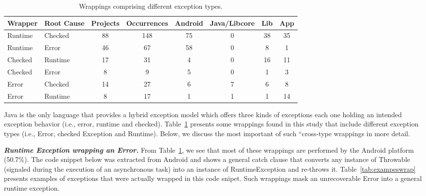 \begin{table}
\scriptsize
  \centering
  \begin{tabular}{llcccccc}
    \hline
    \bfseries{Wrapper}  &  \bfseries{Root Cause} &  \bfseries{Projects}  &  \bfseries{Occurrences} & \textsf{Android} & \textsf{Java/Libcore} & \textsf{Lib} & \textsf{App}  \\
    \hline
      
      Runtime &  Checked   & 88 & 148 &  75 &  0   & 38 &  35 \\  %
      Runtime   &  Error      & 46  &  67    &  58  &  0   & 8  &  1   \\      %
      Checked &  Runtime   & 17  & 31 & 4 &  0  & 16  &  11 \\  %
      Checked & Error         & 8    &  9  & 5  &  0  &  1 &  3  \\
      Error & Checked         & 14  &  27 &  6  &  7  &  6 &   8    \\
      Error & Runtime        & 8      &  17   & 1 &  1  & 1 &  14    \\

  \hline
  \end{tabular}
\caption{Wrappings comprising different exception types.}
\label{tab:wrappingandroid}
\end{table}

Java is the only language that provides a hybrid exception model 
which offers three kinds of exceptions each one holding an intended exception behavior (i.e., error, 
runtime and checked). Table~\ref{tab:wrappingandroid} presents some wrappings found in this study that
include different exception types (i.e., Error, checked Exception and Runtime).
Below, we discuss the most
important of such ``cross-type wrappings in more detail.

\emph{\textbf{Runtime Exception wrapping an Error.}} 
From Table~\ref{tab:wrappingandroid}, we see that most of these wrappings	
are performed by the Android platform (50.7\%).
The code snippet below was extracted from Android and shows a general catch clause 
that converts any instance of Throwable (signaled during the execution
of an asynchronous task) into an instance of RuntimeException and re-throws it.  
Table~\ref{tab:exampeswrap} presents examples of exceptions that were actually wrapped in this code snipet.  
Such wrappings mask an unrecoverable Error into a general runtime exception.

